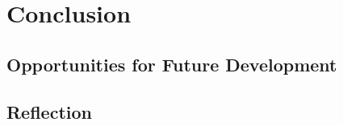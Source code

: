 \chapter{Conclusion}
	
	\section{Opportunities for Future Development}
	
	\section{Reflection}

\bibliographysection

